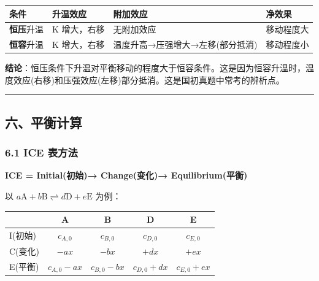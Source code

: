 {\def\LTcaptype{none} %
\begin{longtable}[]{@{}
  >{\raggedright\arraybackslash}p{}
  >{\raggedright\arraybackslash}p{}
  >{\raggedright\arraybackslash}p{}
  >{\raggedright\arraybackslash}p{}@{}}
\toprule\noalign{}
\begin{minipage}[b]{\linewidth}\raggedright
条件
\end{minipage} & \begin{minipage}[b]{\linewidth}\raggedright
升温效应
\end{minipage} & \begin{minipage}[b]{\linewidth}\raggedright
附加效应
\end{minipage} & \begin{minipage}[b]{\linewidth}\raggedright
净效果
\end{minipage} \\
\midrule\noalign{}
\endhead
\bottomrule\noalign{}
\endlastfoot
\textbf{恒压}升温 & K 增大，右移 & 无附加效应 & 移动程度大 \\
\textbf{恒容}升温 & K 增大，右移 & 温度升高→压强增大→左移(部分抵消) & 移动程度小 \\
\end{longtable}
}

\textbf{结论}：恒压条件下升温对平衡移动的程度大于恒容条件。这是因为恒容升温时，温度效应(右移)和压强效应(左移)部分抵消。这是国初真题中常考的辨析点。

\begin{center}\rule{0.5\linewidth}{0.5pt}\end{center}

\subsection{六、平衡计算}\label{ux516dux5e73ux8861ux8ba1ux7b97}

\subsubsection{6.1 ICE 表方法}\label{ice-ux8868ux65b9ux6cd5}

\textbf{ICE = Initial(初始)→ Change(变化)→ Equilibrium(平衡)}

以 \(a\mathrm{A} + b\mathrm{B} \rightleftharpoons d\mathrm{D} + e\mathrm{E}\) 为例：

{\def\LTcaptype{none} %
\begin{longtable}[]{@{}lcccc@{}}
\toprule\noalign{}
& A & B & D & E \\
\midrule\noalign{}
\endhead
\bottomrule\noalign{}
\endlastfoot
I(初始) & \(c_{A,0}\) & \(c_{B,0}\) & \(c_{D,0}\) & \(c_{E,0}\) \\
C(变化) & \(-ax\) & \(-bx\) & \(+dx\) & \(+ex\) \\
E(平衡) & \(c_{A,0}-ax\) & \(c_{B,0}-bx\) & \(c_{D,0}+dx\) & \(c_{E,0}+ex\) \\
\end{longtable}
}


